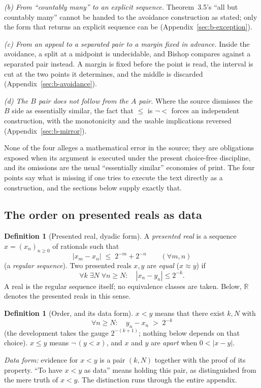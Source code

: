 \documentclass[11pt]{article}
\theoremstyle{definition}
\newtheorem{definition}[theorem]{Definition}
\theoremstyle{remark}
\begin{document}
\emph{(b) From ``countably many'' to an explicit sequence.}  Theorem~3.5's ``all but countably many'' cannot be handed to the avoidance construction as stated; only the form that returns an explicit sequence can be (Appendix~\ref{sec:b-exception}).

\emph{(c) From an appeal to a separated pair to a margin fixed in advance.}  Inside the avoidance, a split at a midpoint is undecidable, and Bishop compares against a separated pair instead.  A margin is fixed before the point is read, the interval is cut at the two points it determines, and the middle is discarded (Appendix~\ref{sec:b-avoidance}).

\emph{(d) The $B$ pair does not follow from the $A$ pair.}  Where the source dismisses the $B$ side as essentially similar, the fact that $\le$ is $\neg<$ forces an independent construction, with the monotonicity and the usable implications reversed (Appendix~\ref{sec:b-mirror}).

None of the four alleges a mathematical error in the source; they are obligations exposed when its argument is executed under the present choice-free discipline, and its omissions are the usual ``essentially similar'' economies of print.  The four points say what is missing if one tries to execute the text directly as a construction, and the sections below supply exactly that.

\subsection{The order on presented reals as data}
\label{sec:b-order}

\begin{definition}[Presented real, dyadic form]
\label{def:b-real}
A \emph{presented real} is a sequence $x=(x_n)_{n\ge0}$ of rationals such that
\[
|x_m-x_n|\;\le\;2^{-m}+2^{-n}\qquad(\forall m,n)
\]
(a \emph{regular sequence}).  Two presented reals $x,y$ are \emph{equal} ($x\approx y$) if
\[
\forall k\;\exists N\;\forall n\ge N:\quad |x_n-y_n|\le 2^{-k}.
\]
A real is the regular sequence itself; no equivalence classes are taken.  Below, $\mathbb{R}$ denotes the presented reals in this sense.
\end{definition}

\begin{definition}[Order, and its data form]
\label{def:b-order}
$x<y$ means that there exist $k,N$ with
\[
\forall n\ge N:\quad y_n-x_n\;>\;2^{-k}
\]
(the development takes the gauge $2^{-(k+1)}$; nothing below depends on that choice).  $x\le y$ means $\neg\,(y<x)$, and $x$ and $y$ are \emph{apart} when $0<|x-y|$.

\emph{Data form:} evidence for $x<y$ is a pair $(k,N)$ together with the proof of its property.  ``To have $x<y$ as data'' means holding this pair, as distinguished from the mere truth of $x<y$.  The distinction runs through the entire appendix.
\end{definition}
\end{document}
